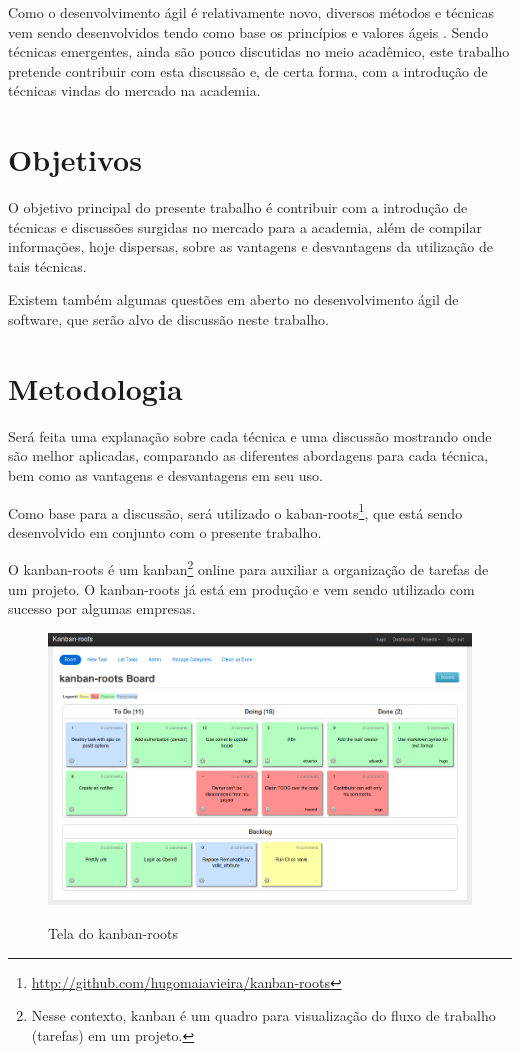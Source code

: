 Como o desenvolvimento ágil é relativamente novo, diversos métodos e técnicas
vem sendo desenvolvidos tendo como base os princípios e valores ágeis
\cite{BDDRodrigo}. Sendo técnicas emergentes, ainda são pouco discutidas no meio
acadêmico, este trabalho pretende contribuir com esta discussão e, de certa
forma, com a introdução de técnicas vindas do mercado na academia.



\section{Objetivos}

O objetivo principal do presente trabalho é contribuir com a introdução de
técnicas e discussões surgidas no mercado para a academia, além de compilar
informações, hoje dispersas, sobre as vantagens e desvantagens da utilização de
tais técnicas.

Existem também algumas questões em aberto no desenvolvimento ágil de software,
que serão alvo de discussão neste trabalho.

\section{Metodologia}

Será feita uma explanação sobre cada técnica e uma discussão mostrando onde são
melhor aplicadas, comparando as diferentes abordagens para cada técnica, bem
como as vantagens e desvantagens em seu uso.

Como base para a discussão, será utilizado o
kaban-roots\footnote{\href{http://github.com/hugomaiavieira/kanban-roots}
{http://github.com/hugomaiavieira/kanban-roots}}, que está sendo desenvolvido em
conjunto com o presente trabalho.

O kanban-roots é um kanban\footnote{Nesse contexto, kanban é um quadro para
visualização do fluxo de trabalho (tarefas) em um projeto.} online para auxiliar
a organização de tarefas de um projeto. O kanban-roots já está em produção
e vem sendo utilizado com sucesso por algumas empresas.

\begin{figure}[h]
    \center
    \caption{Tela do  kanban-roots}
    \includegraphics[scale=0.45]{images/kanban-roots}
    \label{tela_kaban_roots}
\end{figure}
